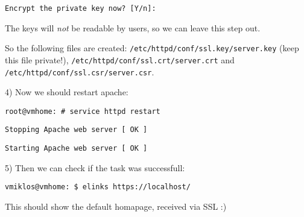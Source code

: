 {\tt Encrypt the private key now? [Y/n]:}

The keys will \textit{not} be readable by users, so we can leave this step out.

So the following files are created: {\tt /etc/httpd/conf/ssl.key/server.key} (keep this file private!), {\tt /etc/httpd/conf/ssl.crt/server.crt} and {\tt /etc/httpd/conf/ssl.csr/server.csr}.

4) Now we should restart apache:

{\tt root@vmhome:~# service httpd restart}

{\tt Stopping Apache web server [  OK  ]}

{\tt Starting Apache web server [  OK  ]}

5) Then we can check if the task was successfull:

{\tt vmiklos@vmhome:~\$ elinks https://localhost/}

This should show the default homapage, received via SSL :)
